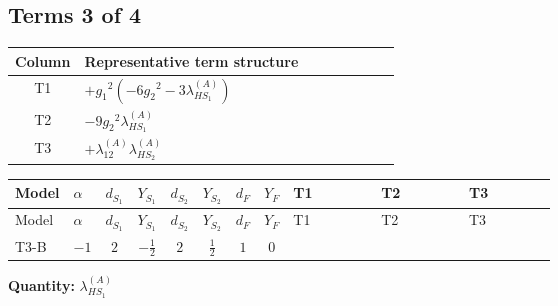 \documentclass[8pt]{article}
\begin{document}
\begin{landscape}
\subsection*{Terms 3 of 4}
\begin{center}
\begin{tabular}{@{}c >{\raggedright\arraybackslash}p{0.82\linewidth}@{}}
\toprule
Column & Representative term structure \\
\midrule
T1 & \(\displaystyle +{g_1}^2 \left(-6 {g_2}^2-3 {\lambda_{HS_1}^{(A)}}\right)\) \\
\midrule
T2 & \(\displaystyle -9 {g_2}^2 {\lambda_{HS_1}^{(A)}}\) \\
\midrule
T3 & \(\displaystyle +{\lambda_{12}^{(A)}} {\lambda_{HS_2}^{(A)}}\) \\
\midrule
\bottomrule
\end{tabular}
\end{center}
\smallskip
\tiny
\begin{longtable}{@{}llcccccc >{\raggedright\arraybackslash}p{0.21\linewidth} >{\raggedright\arraybackslash}p{0.21\linewidth} >{\raggedright\arraybackslash}p{0.21\linewidth}@{}}
\toprule
Model & $\alpha$ & $d_{S_1}$ & $Y_{S_1}$ & $d_{S_2}$ & $Y_{S_2}$ & $d_F$ & $Y_F$ & T1 & T2 & T3 \\
\midrule
\endfirsthead
\toprule
Model & $\alpha$ & $d_{S_1}$ & $Y_{S_1}$ & $d_{S_2}$ & $Y_{S_2}$ & $d_F$ & $Y_F$ & T1 & T2 & T3 \\
\midrule
\endhead
T3-B & $-1$ & $2$ & $-\frac{1}{2}$ & $2$ & $\frac{1}{2}$ & $1$ & $0$ & \scriptsize\adjustbox{max width=\linewidth}{$\begin{gathered} +{g_1}^2 \left(-6 {g_2}^2-3 {\lambda_{HS_1}^{(A)}}\right)\end{gathered}$} & \scriptsize\adjustbox{max width=\linewidth}{$\begin{gathered} -9 {g_2}^2 {\lambda_{HS_1}^{(A)}}\end{gathered}$} & \scriptsize\adjustbox{max width=\linewidth}{$\begin{gathered} +{\lambda_{12}^{(A)}} {\lambda_{HS_2}^{(A)}}\end{gathered}$} \\
\midrule
\bottomrule
\end{longtable}
\clearpage
\noindent\textbf{Quantity: }$\lambda_{HS_1}^{(A)}$\par\smallskip

\end{landscape}
\end{document}

